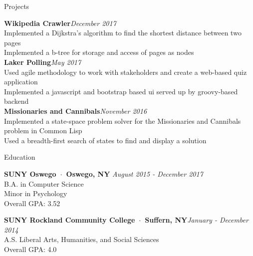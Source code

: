 \documentclass{resume} %
\begin{document}

\begin{rSection}{Projects}

{\bf Wikipedia Crawler}\hfill{\em December 2017} \\
Implemented a Dijkstra's algorithm to find the shortest distance between two pages \\
Implemented a b-tree for storage and access of pages as nodes \\

{\bf Laker Polling}\hfill{\em May 2017} \\
Used agile methodology to work with stakeholders and create a web-based quiz application \\
Implemented a javascript and bootstrap based ui served up by groovy-based backend \\

{\bf Missionaries and Cannibals}\hfill{\em November 2016} \\
Implemented a state-space problem solver for the Missionaries and Cannibals problem in Common Lisp \\
Used a breadth-first search of states to find and display a solution \\

\end{rSection}


\begin{rSection}{Education}

{\bf SUNY Oswego~$\cdot$~Oswego, NY} \hfill {\em August 2015 - December 2017} \\ 
B.A. in Computer Science \\
Minor in Psychology \smallskip \\
Overall GPA: 3.52

{\bf SUNY Rockland Community College~$\cdot$~Suffern, NY}\hfill{\em January - December 2014}\\
A.S. Liberal Arts, Humanities, and Social Sciences \\
Overall GPA: 4.0

\end{rSection}

\end{document}
